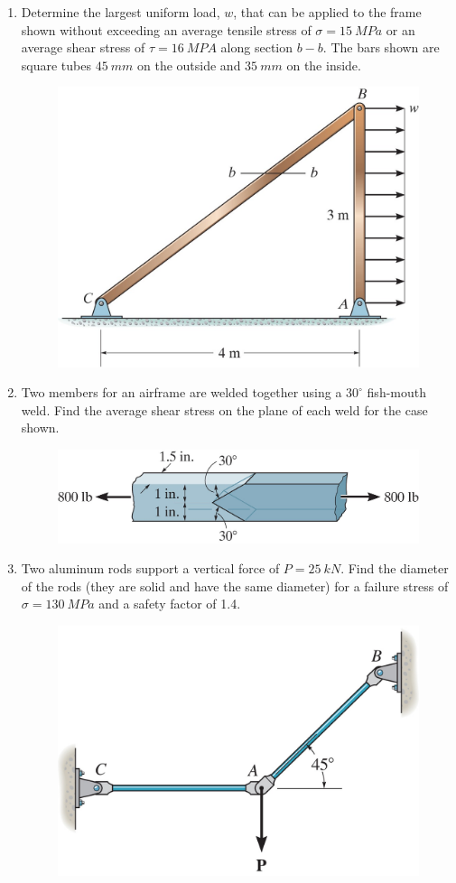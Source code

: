 \documentclass[12pt, oneside]{article}
\begin{document}
\begin{enumerate}
	\item %
		Determine the largest uniform load, $w$, that can be applied to the frame shown without exceeding an average tensile stress of $\sigma = \SI{15}{MPa}$ or an average shear stress of $\tau = \SI{16}{MPA}$ along section $b-b$.
		The bars shown are square tubes $\SI{45}{mm}$ on the outside and $\SI{35}{mm}$ on the inside.
		\begin{figure}[H]
			\centering
			\includegraphics[width=0.6\linewidth]{truss}
			\label{fig:truss}
		\end{figure}
		\pagebreak
	
	\item %
		Two members for an airframe are welded together using a $30^\circ$ fish-mouth weld.
		Find the average shear stress on the plane of each weld for the case shown.
		\begin{figure}[H]
			\centering
			\includegraphics[width=0.6\linewidth]{fish-mouth}
			\label{fig:fish-mouth}
		\end{figure}

	\item %
		Two aluminum rods support a vertical force of $P=\SI{25}{kN}$.
		Find the diameter of the rods (they are solid and have the same diameter) for a failure stress of $\sigma=\SI{130}{MPa}$ and a safety factor of 1.4.
		\begin{figure}[H]
			\centering
			\includegraphics[width=0.6\linewidth]{rods}
			\label{fig:rods}
		\end{figure}
		\pagebreak


\end{enumerate}
\end{document}
